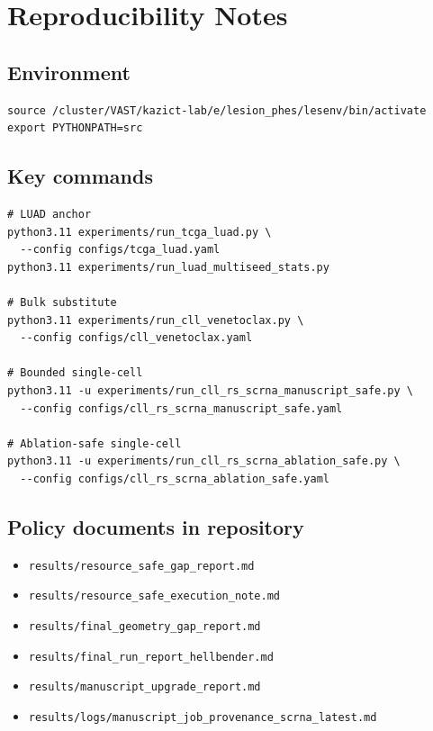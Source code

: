 \documentclass[11pt]{article}
\begin{document}
\section{Reproducibility Notes}
\label{sec:repro}

\subsection{Environment}
\begin{verbatim}
source /cluster/VAST/kazict-lab/e/lesion_phes/lesenv/bin/activate
export PYTHONPATH=src
\end{verbatim}

\subsection{Key commands}
\begin{verbatim}
# LUAD anchor
python3.11 experiments/run_tcga_luad.py \
  --config configs/tcga_luad.yaml
python3.11 experiments/run_luad_multiseed_stats.py

# Bulk substitute
python3.11 experiments/run_cll_venetoclax.py \
  --config configs/cll_venetoclax.yaml

# Bounded single-cell
python3.11 -u experiments/run_cll_rs_scrna_manuscript_safe.py \
  --config configs/cll_rs_scrna_manuscript_safe.yaml

# Ablation-safe single-cell
python3.11 -u experiments/run_cll_rs_scrna_ablation_safe.py \
  --config configs/cll_rs_scrna_ablation_safe.yaml
\end{verbatim}

\subsection{Policy documents in repository}
\begin{itemize}[leftmargin=1.5em]
\item \texttt{results/resource\_safe\_gap\_report.md}
\item \texttt{results/resource\_safe\_execution\_note.md}
\item \texttt{results/final\_geometry\_gap\_report.md}
\item \texttt{results/final\_run\_report\_hellbender.md}
\item \texttt{results/manuscript\_upgrade\_report.md}
\item \texttt{results/logs/manuscript\_job\_provenance\_scrna\_latest.md}
\end{itemize}
\end{document}
